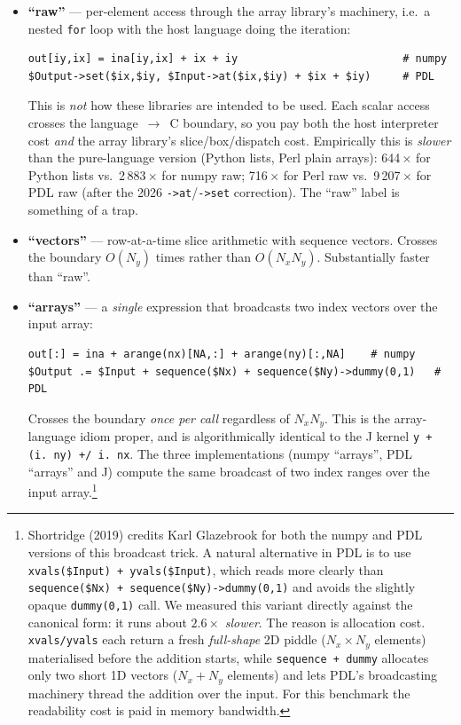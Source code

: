 \documentclass[11pt,a4paper]{article}
\begin{document}
\begin{itemize}
\item \textbf{``raw''} --- per-element access through the array
library's machinery, i.e.\ a nested \texttt{for} loop with the
host language doing the iteration:
\begin{lstlisting}
out[iy,ix] = ina[iy,ix] + ix + iy                          # numpy
$Output->set($ix,$iy, $Input->at($ix,$iy) + $ix + $iy)     # PDL
\end{lstlisting}
This is \emph{not} how these libraries are intended to be used.
Each scalar access crosses the language~$\to$~C boundary, so you
pay both the host interpreter cost \emph{and} the array library's
slice/box/dispatch cost. Empirically this is \emph{slower} than the
pure-language version (Python lists, Perl plain arrays):
644\,$\times$ for Python lists vs.\ 2\,883\,$\times$ for numpy raw;
716\,$\times$ for Perl raw vs.\ 9\,207\,$\times$ for PDL raw (after the 2026 \texttt{->at}/\texttt{->set} correction).
The ``raw'' label is something of a trap.

\item \textbf{``vectors''} --- row-at-a-time slice arithmetic with
sequence vectors. Crosses the boundary $O(N_y)$ times rather than
$O(N_x N_y)$. Substantially faster than ``raw''.

\item \textbf{``arrays''} --- a \emph{single} expression that
broadcasts two index vectors over the input array:
\begin{lstlisting}
out[:] = ina + arange(nx)[NA,:] + arange(ny)[:,NA]    # numpy
$Output .= $Input + sequence($Nx) + sequence($Ny)->dummy(0,1)   # PDL
\end{lstlisting}
Crosses the boundary \emph{once per call} regardless of $N_x N_y$.
This is the array-language idiom proper, and is algorithmically
identical to the J kernel \verb|y + (i. ny) +/ i. nx|. The three
implementations (numpy ``arrays'', PDL ``arrays'' and J) compute the
same broadcast of two index ranges over the input
array.\footnote{Shortridge (2019) credits Karl Glazebrook for both
the numpy and PDL versions of this broadcast trick. A natural
alternative in PDL is to use \texttt{xvals(\$Input) +
yvals(\$Input)}, which reads more clearly than
\texttt{sequence(\$Nx) + sequence(\$Ny)->dummy(0,1)} and avoids the
slightly opaque \texttt{dummy(0,1)} call. We measured this variant
directly against the canonical form: it runs about $2.6\times$
\emph{slower}. The reason is allocation cost. \texttt{xvals/yvals}
each return a fresh \emph{full-shape} 2D piddle ($N_x \times N_y$
elements) materialised before the addition starts, while
\texttt{sequence + dummy} allocates only two short 1D vectors
($N_x + N_y$ elements) and lets PDL's broadcasting machinery thread
the addition over the input. For this benchmark the readability
cost is paid in memory bandwidth.}
\end{itemize}
\end{document}
